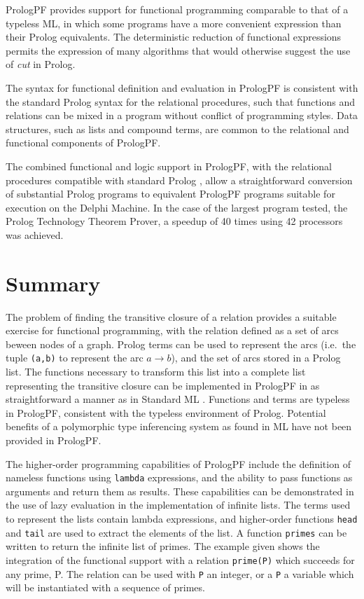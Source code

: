 PrologPF provides support for functional programming comparable to that of a typeless ML,
in which some programs have a more convenient expression than their Prolog equivalents.  The
deterministic reduction of functional expressions permits the expression of many algorithms
that would otherwise suggest the use of \textit{cut} in Prolog.

The syntax for functional definition and evaluation in PrologPF is consistent with the
standard Prolog syntax for the relational procedures, such that functions and relations
can be mixed in a program without conflict of programming styles.  Data structures, such
as lists and compound terms, are common to the relational and functional components of
PrologPF.

The combined functional and logic support in PrologPF, with the relational procedures
compatible with standard Prolog \cite{DEDC96}, allow a straightforward conversion of
substantial Prolog programs to equivalent PrologPF programs suitable for execution on
the Delphi Machine.  In the case of the largest program tested, the Prolog Technology
Theorem Prover, a speedup of 40 times using 42 processors was achieved.

\section{Summary} %

The problem of finding the transitive closure of a relation provides a suitable
exercise for functional programming, with the relation defined as a set of arcs beween
nodes of a graph.  Prolog terms can be used to represent the arcs (i.e.\ the tuple
\texttt{(a,b)} to represent the arc $a\rightarrow b$), and the set of arcs stored in
a Prolog list.  The functions necessary to transform this list into a complete list
representing the transitive closure can be implemented in PrologPF in as straightforward
a manner as in Standard ML \cite{MTH90}.  Functions and terms are typeless in PrologPF,
consistent with the typeless environment of Prolog.  Potential benefits of a polymorphic
type inferencing system as found in ML have not been provided in PrologPF.

The higher-order programming capabilities of PrologPF include the definition of nameless
functions using \texttt{lambda} expressions, and the ability to pass functions as arguments
and return them as results.  These capabilities can be demonstrated in the use
of lazy evaluation in the implementation of infinite lists.  The terms used to represent
the lists contain lambda expressions, and higher-order functions \texttt{head} and
\texttt{tail} are used to extract the elements of the list.  A function \texttt{primes}
can be written to return the infinite list of primes.  The example given shows the
integration of the functional support with a relation \texttt{prime(P)} which succeeds for
any prime, P.  The relation can be used with \texttt{P} an integer, or a 
\texttt{P} a variable which
will be instantiated with a sequence of primes.

